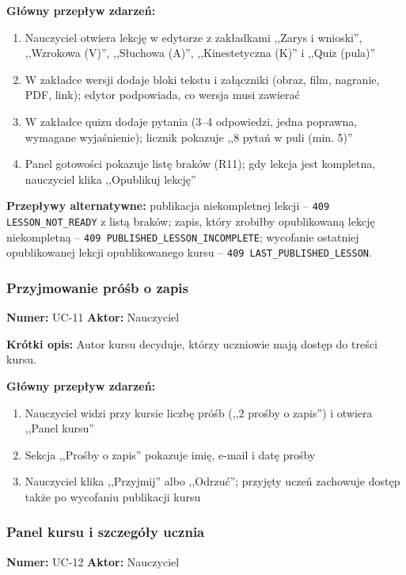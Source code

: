 \textbf{Główny przepływ zdarzeń:}
\begin{enumerate}[leftmargin=*]
    \item Nauczyciel otwiera lekcję w edytorze z zakładkami ,,Zarys i wnioski'', ,,Wzrokowa (V)'', ,,Słuchowa (A)'', ,,Kinestetyczna (K)'' i ,,Quiz (pula)''
    \item W zakładce wersji dodaje bloki tekstu i załączniki (obraz, film, nagranie, PDF, link); edytor podpowiada, co wersja musi zawierać
    \item W zakładce quizu dodaje pytania (3--4 odpowiedzi, jedna poprawna, wymagane wyjaśnienie); licznik pokazuje ,,8 pytań w puli (min. 5)''
    \item Panel gotowości pokazuje listę braków (R11); gdy lekcja jest kompletna, nauczyciel klika ,,Opublikuj lekcję''
\end{enumerate}

\textbf{Przepływy alternatywne:} publikacja niekompletnej lekcji -- \texttt{409 LESSON\_NOT\_READY} z listą braków; zapis, który zrobiłby opublikowaną lekcję niekompletną -- \texttt{409 PUBLISHED\_LESSON\_INCOMPLETE}; wycofanie ostatniej opublikowanej lekcji opublikowanego kursu -- \texttt{409 LAST\_PUBLISHED\_LESSON}.

\subsubsection{Przyjmowanie próśb o zapis}
\textbf{Numer:} UC-11 \quad \textbf{Aktor:} Nauczyciel

\textbf{Krótki opis:} Autor kursu decyduje, którzy uczniowie mają dostęp do treści kursu.

\textbf{Główny przepływ zdarzeń:}
\begin{enumerate}[leftmargin=*]
    \item Nauczyciel widzi przy kursie liczbę próśb (,,2 prośby o zapis'') i otwiera ,,Panel kursu''
    \item Sekcja ,,Prośby o zapis'' pokazuje imię, e-mail i datę prośby
    \item Nauczyciel klika ,,Przyjmij'' albo ,,Odrzuć''; przyjęty uczeń zachowuje dostęp także po wycofaniu publikacji kursu
\end{enumerate}

\subsubsection{Panel kursu i szczegóły ucznia}
\textbf{Numer:} UC-12 \quad \textbf{Aktor:} Nauczyciel

